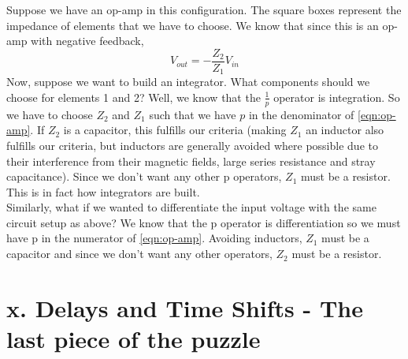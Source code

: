 \documentclass{report}
\begin{document}
\begin{figure}[h]
\end{figure}

Suppose we have an op-amp in this configuration. The square boxes represent the impedance of elements that we have to choose. We know that since this is an op-amp with negative feedback, 
\begin{equation}
\label{eqn:op-amp}
    V_{out} = -\frac{Z_2}{Z_1} V_{in}
\end{equation}
Now, suppose we want to build an integrator. What components should we choose for elements 1 and 2? Well, we know that the $\tfrac{1}{p}$ operator is integration. So we have to choose $Z_2$ and $Z_1$ such that we have $p$ in the denominator of \cref{eqn:op-amp}. If $Z_2$ is a capacitor, this fulfills our criteria (making $Z_1$ an inductor also fulfills our criteria, but inductors are generally avoided where possible due to their interference from their magnetic fields, large series resistance and stray capacitance). Since we don't want any other p operators, $Z_1$ must be a resistor. This is in fact how integrators are built.\smallskip \\
Similarly, what if we wanted to differentiate the input voltage with the same circuit setup as above? We know that the p operator is differentiation so we must have p in the numerator of \cref{eqn:op-amp}. Avoiding inductors, $Z_1$ must be a capacitor and since we don't want any other operators, $Z_2$ must be a resistor.


\section{x. Delays and Time Shifts - The last piece of the puzzle}
\end{document}
